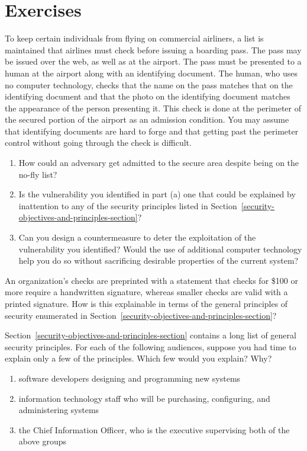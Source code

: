 \section*{Exercises}
\begin{chapterEnumerate}
\item
To keep certain individuals from flying on commercial airliners, a
list is maintained that airlines must check before issuing a
boarding pass.  The pass may be issued over the web, as well as at the
airport.  The pass must be presented to a human at the airport along
with an identifying document.  The human, who uses no computer
technology, checks that the name on the pass matches that on the
identifying document and that the photo on the identifying document
matches the appearance of the person presenting it.  This check is
done at the perimeter of the secured portion of the airport as an
admission condition.  You may assume that identifying documents are
hard to forge and that getting past the perimeter control without
going through the check is difficult.
\begin{enumerate}
\item
How could an adversary get admitted to the secure area despite being
on the no-fly list?
\item
Is the vulnerability you identified in part (a) one that could be
explained by inattention to any of the security principles listed in
Section~\ref{security-objectives-and-principles-section}?
\item
Can you design a countermeasure to deter the exploitation of the
vulnerability you identified?  Would the use of additional computer
technology help you do so without sacrificing desirable properties of
the current system?
\end{enumerate}

\item
An organization's checks are preprinted with a statement that checks
for \$100 or more require a handwritten signature, whereas smaller
checks are valid with a printed signature.  How is this explainable in
terms of the general principles of security enumerated in
Section~\ref{security-objectives-and-principles-section}?

\item
Section~\ref{security-objectives-and-principles-section} contains a
long list of general security principles.  For each of the following
audiences, suppose you had time to explain only a few of the
principles.  Which few would you explain?  Why?
\begin{enumerate}
\item software developers designing and programming new systems
\item information technology staff who will be
  purchasing, configuring, and administering systems
\item the Chief Information Officer, who is the executive supervising both of
   the above groups
\end{enumerate}


\end{chapterEnumerate}
